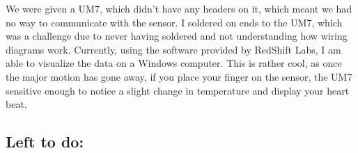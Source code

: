 \documentclass[compsoc,draftclsnofoot,onecolumn,10pt]{IEEEtran}
\begin{document}
		We were given a UM7, which didn't have any headers on it, which meant we had no way to communicate with the sensor. 
		I soldered on ends to the UM7, which was a challenge due to never having soldered and not understanding how wiring diagrams work.
		Currently, using the software provided by RedShift Labs, I am able to visualize the data on a Windows computer. 
		This is rather cool, as once the major motion has gone away, if you place your finger on the sensor, the UM7 sensitive enough to notice a slight change in temperature and display your heart beat. 
		
		
		
	\subsection{Left to do:}
\end{document}
